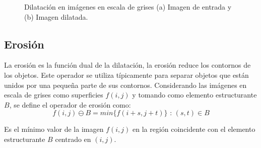 \begin{figure}[H]
	\centering
	\caption{Dilatación en imágenes en escala de grises (a) Imagen de entrada y (b) Imagen dilatada.}
	\label{fig:dilatacion}
\end{figure}

    
    
\subsection{Erosión}



La erosión es la función dual de la dilatación, la erosión reduce los contornos de los objetos. Este operador se utiliza típicamente para separar objetos que están unidos por una pequeña parte de sus contornos. Considerando  las  imágenes  en  escala  de  grises  como  superficies   $f(i,j)$ y tomando  como elemento estructurante $B$, se define el operador de erosión como:
\begin{equation}
f(i,j) \ominus{B} =min \{ f(i+s,j+t) \} \text{ : } (s,t) \in B  
\label{eqb:t}
\end{equation} 


Es el mínimo valor de la imagen $f(i,j)$ en la región coincidente con el elemento estructurante $B$ centrado en $(i,j)$.



